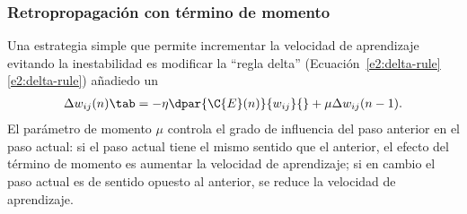 %
\subsubsection{Retropropagación con término de momento}
%
Una estrategia simple que permite incrementar la velocidad de aprendizaje
evitando la inestabilidad es modificar la ``regla delta''
(\iflatexml{}Ecuación~\ref{e2:delta-rule}\else\autoref{e2:delta-rule}\fi)
añadiedo un 
%
\begin{align}\label{e2:momentum-term}
  \Delta w_{ij}(n)\tab=-\eta\dpar{\C{E}(n)}{w_{ij}}{}
  +\mu\Delta w_{ij}(n-1).
\end{align}
%
El parámetro de momento $\mu$ controla el grado de influencia del paso
anterior en el paso actual: si el paso actual tiene el mismo sentido
que el anterior, el efecto del término de momento es aumentar la
velocidad de aprendizaje; si en cambio el paso actual es de sentido
opuesto al anterior, se reduce la velocidad de aprendizaje.

